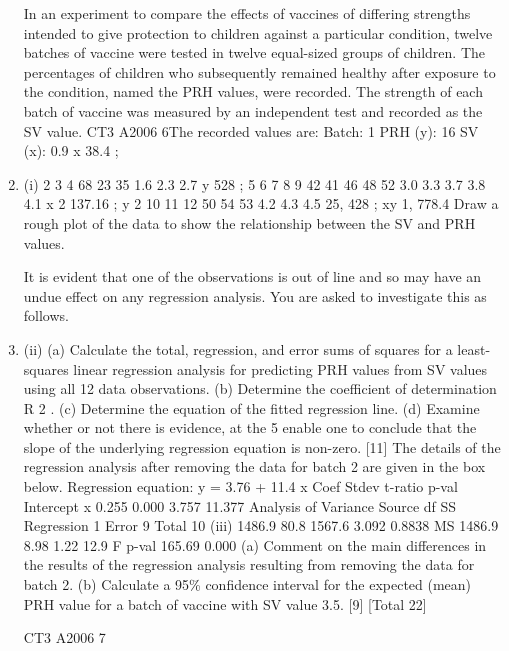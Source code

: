 \documentclass[a4paper,12pt]{article}
\begin{document}
\begin{enumerate}
In an experiment to compare the effects of vaccines of differing strengths intended to
give protection to children against a particular condition, twelve batches of vaccine
were tested in twelve equal-sized groups of children. The percentages of children
who subsequently remained healthy after exposure to the condition, named the PRH
values, were recorded. The strength of each batch of vaccine was measured by an
independent test and recorded as the SV value.
CT3 A2006 6The recorded values are:
Batch:
1
PRH (y): 16
SV (x):
0.9
x 38.4 ;
\item (i)
2
3
4
68 23 35
1.6 2.3 2.7
y
528 ;
5
6
7
8
9
42 41 46 48 52
3.0 3.3 3.7 3.8 4.1
x 2 137.16 ;
y 2
10 11 12
50 54 53
4.2 4.3 4.5
25, 428 ;
xy 1, 778.4
Draw a rough plot of the data to show the relationship between the SV and
PRH values.

It is evident that one of the observations is out of line and so may have an undue
effect on any regression analysis. You are asked to investigate this as follows.
\item (ii)
(a) Calculate the total, regression, and error sums of squares for a least-
squares linear regression analysis for predicting PRH values from SV
values using all 12 data observations.
(b) Determine the coefficient of determination R 2 .
(c) Determine the equation of the fitted regression line.
(d) Examine whether or not there is evidence, at the 5%
enable one to conclude that the slope of the underlying regression
equation is non-zero.
[11]
The details of the regression analysis after removing the data for batch 2 are given in
the box below.
Regression equation: y = 3.76 + 11.4 x
Coef
Stdev
t-ratio p-val
Intercept
x 0.255
0.000
3.757
11.377
Analysis of Variance
Source
df
SS
Regression 1
Error
9
Total
10
(iii)
1486.9
80.8
1567.6
3.092
0.8838
MS
1486.9
8.98
1.22
12.9
F p-val
165.69 0.000
(a) Comment on the main differences in the results of the regression
analysis resulting from removing the data for batch 2.
(b) Calculate a 95\% confidence interval for the expected (mean) PRH
value for a batch of vaccine with SV value 3.5.
[9]
[Total 22]

CT3 A2006 7


\end{enumerate}
\end{document}
